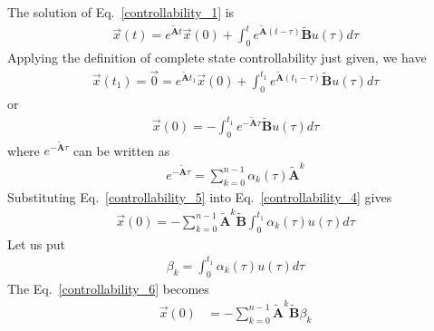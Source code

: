 \documentclass[12pt,a4paper,oneside]{book}
\begin{document}
\begin{onehalfspace}
The solution of Eq.~\eqref{controllability_1} is
\begin{equation}\label{controllability_2}
	\begin{aligned}
		\vec{x}(t)=e^{\tilde{\mathbf{A}}t}\vec{x}(0)+\int_{0}^{t}e^{\tilde{\mathbf{A}}
		 (t-\tau)}\tilde{\mathbf{B}}u(\tau)d\tau
	\end{aligned}
\end{equation}
Applying the definition of complete state controllability just given, we have
\begin{equation}\label{controllability_3}
	\begin{aligned}
		\vec{x}(t_1)=\vec{0}=e^{\tilde{\mathbf{A}}t_1}\vec{x}(0)+ 
		\int_{0}^{t_1}e^{\tilde{\mathbf{A}}(t_1-\tau)}\tilde{\mathbf{B}}u(\tau)d\tau
	\end{aligned}
\end{equation}
or 
\begin{equation}\label{controllability_4}
	\begin{aligned}
		\vec{x}(0)=-\int_{0}^{t_1}e^{-\tilde{\mathbf{A}}\tau} 
		\tilde{\mathbf{B}}u(\tau)d\tau
	\end{aligned}
\end{equation}
where $e^{-\tilde{\mathbf{A}}\tau}$ can be written as
\begin{equation}\label{controllability_5}
	\begin{aligned}
		e^{-\tilde{\mathbf{A}}\tau}=\sum_{k=0}^{n-1}\alpha_k(\tau)\tilde{\mathbf{A}}^k
	\end{aligned}
\end{equation}
Substituting Eq.~\eqref{controllability_5} into Eq.~\eqref{controllability_4} 
gives
\begin{equation}\label{controllability_6}
	\begin{aligned}
		\vec{x}(0)=-\sum_{k=0}^{n-1}\tilde{\mathbf{A}}^k\tilde{\mathbf{B}} 
		\int_{0}^{t_1}\alpha_k(\tau)u(\tau)d\tau
	\end{aligned}
\end{equation}
Let us put
\begin{equation}\label{controllability_7}
	\begin{aligned}
		\beta_k=\int_{0}^{t_1}\alpha_k(\tau)u(\tau)d\tau
	\end{aligned}
\end{equation}
The Eq.~\eqref{controllability_6} becomes
\begin{equation}\label{controllability_8}
	\begin{aligned}
		\vec{x}(0)&=-\sum_{k=0}^{n-1}\tilde{\mathbf{A}}^k\tilde{\mathbf{B}}\beta_k

\end{aligned}
\end{equation}
\end{onehalfspace}
\end{document}
